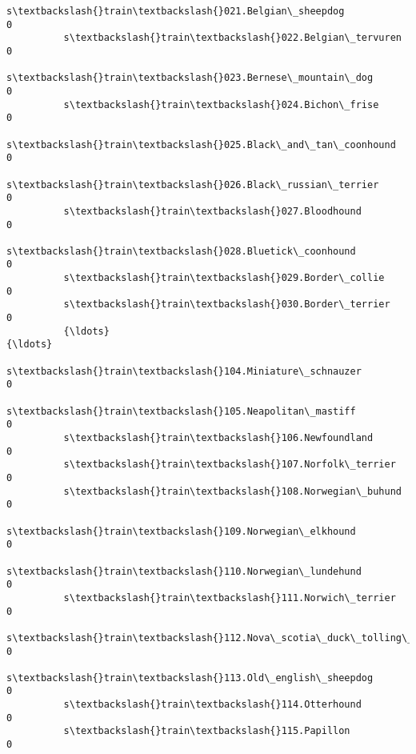 \documentclass[11pt]{article}
\begin{document}
\begin{Verbatim}[commandchars=\\\{\}]
          s\textbackslash{}train\textbackslash{}021.Belgian\_sheepdog                                            0   
          s\textbackslash{}train\textbackslash{}022.Belgian\_tervuren                                            0   
          s\textbackslash{}train\textbackslash{}023.Bernese\_mountain\_dog                                        0   
          s\textbackslash{}train\textbackslash{}024.Bichon\_frise                                                0   
          s\textbackslash{}train\textbackslash{}025.Black\_and\_tan\_coonhound                                     0   
          s\textbackslash{}train\textbackslash{}026.Black\_russian\_terrier                                       0   
          s\textbackslash{}train\textbackslash{}027.Bloodhound                                                  0   
          s\textbackslash{}train\textbackslash{}028.Bluetick\_coonhound                                          0   
          s\textbackslash{}train\textbackslash{}029.Border\_collie                                               0   
          s\textbackslash{}train\textbackslash{}030.Border\_terrier                                              0   
          {\ldots}                                                                   {\ldots}   
          s\textbackslash{}train\textbackslash{}104.Miniature\_schnauzer                                         0   
          s\textbackslash{}train\textbackslash{}105.Neapolitan\_mastiff                                          0   
          s\textbackslash{}train\textbackslash{}106.Newfoundland                                                0   
          s\textbackslash{}train\textbackslash{}107.Norfolk\_terrier                                             0   
          s\textbackslash{}train\textbackslash{}108.Norwegian\_buhund                                            0   
          s\textbackslash{}train\textbackslash{}109.Norwegian\_elkhound                                          0   
          s\textbackslash{}train\textbackslash{}110.Norwegian\_lundehund                                         0   
          s\textbackslash{}train\textbackslash{}111.Norwich\_terrier                                             0   
          s\textbackslash{}train\textbackslash{}112.Nova\_scotia\_duck\_tolling\_retriever                          0   
          s\textbackslash{}train\textbackslash{}113.Old\_english\_sheepdog                                        0   
          s\textbackslash{}train\textbackslash{}114.Otterhound                                                  0   
          s\textbackslash{}train\textbackslash{}115.Papillon                                                    0   

\end{Verbatim}
\end{document}
